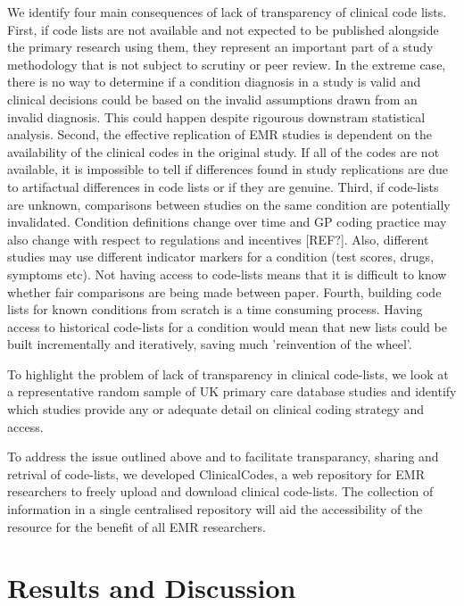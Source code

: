 \documentclass[10pt]{article}
\begin{document}
We identify four main consequences of lack of transparency of clinical code lists.  First, if code lists are not available and not expected to be published alongside the primary research using them, they represent an important part of a study methodology that is not subject to scrutiny or peer review. In the extreme case, there is no way to determine if a condition diagnosis in a study is valid and clinical decisions could be based on the invalid assumptions drawn from an invalid diagnosis.  This could happen despite rigourous downstram statistical analysis.  Second, the effective replication of EMR studies is dependent on the availability of the clinical codes in the original study.  If all of the codes are not available, it is impossible to tell if differences found in study replications are due to artifactual differences in code lists or if they are genuine.  Third, if code-lists are unknown, comparisons between studies on the same condition are potentially invalidated.  Condition definitions change over time and GP coding practice may also change with respect to regulations and incentives [REF?]. Also, different studies may use different indicator markers for a condition (test scores, drugs, symptoms etc).  Not having access to code-lists means that it is difficult to know whether fair comparisons are being made between paper. Fourth, building code lists for known conditions from scratch is a time consuming process. Having access to historical code-lists  for a condition would mean that new lists could be built incrementally and iteratively, saving much 'reinvention of the wheel'.

To highlight the problem of lack of transparency in clinical code-lists, we look at a representative random sample of UK primary care database studies and identify which studies provide any or adequate detail on clinical coding strategy and access.

To address the issue outlined above and to facilitate transparancy, sharing and retrival of code-lists, we developed ClinicalCodes, a web repository for EMR researchers to freely upload and download clinical code-lists. The collection  of information in a single centralised repository will aid the accessibility of the resource for the benefit of all EMR researchers.

\section*{Results and Discussion}
\end{document}
